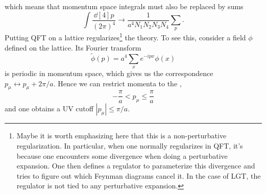 which means that momentum space integrals must also be replaced by
sums
\begin{equation}
  \int\frac{\dd[4]{p}}{(2\pi)^4}\to
  \frac{1}{a^4N_1N_2N_3N_4}\sum_p. 
\end{equation}
Putting QFT on a lattice regularizes\footnote{Maybe it is worth
emphasizing here that this is a non-perturbative regularization. 
In particular, when one normally regularizes in QFT, it's because
one encounters some divergence when doing a perturbative
expansion. One then defines a regulator to parameterize this
divergence and tries to figure out which Feynman diagrams 
cancel it. In the case of LGT, the regulator is not tied to
any perturbative expansion.} the theory. 
To see this, consider a field $\phi$ defined on the lattice. 
Its Fourier transform
\begin{equation}
  \widetilde{\phi}(p)=a^4\sum_xe^{-ipx}\phi(x)
\end{equation}
is periodic in momentum space, which gives us the correspondence
$p_\mu\leftrightarrow p_\mu+2\pi/a$. Hence we can restrict
momenta to the ,
\begin{equation}
 -\frac{\pi}{a}<p_\mu\le\frac{\pi}{a}
\end{equation}
and one obtains a UV cutoff $|p_\mu|\le\pi/a$.

